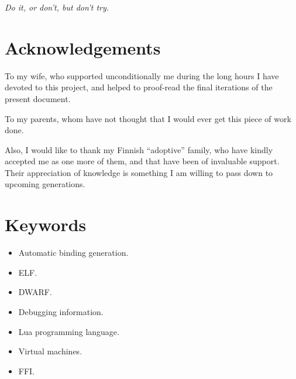 \documentclass[a4paper,
	fontsize=12pt,
	titlepage=firstiscover,
	chapterprefix=true,
	appendixprefix=true,
	headings=big,
	headsepline,
	toc=bibliographynumbered,
	twoside]{scrbook}
\begin{document}
\frontmatter

\clearpage
\listoftodos

\cleardoublepage
\begin{minipage}[t][6cm][l]{\textwidth}
	\vspace{10cm}
	\begin{flushright}
		\textit{Do it, or don't, but don't try.}
	\end{flushright}
\end{minipage}

\cleardoublepage
\chapter*{Acknowledgements}


\begin{minipage}{0.6\textwidth}
\begin{raggedleft} \itshape

To my wife, who supported unconditionally me during the long hours I have
devoted to this project, and helped to proof-read the final iterations of the
present document.

\vspace{2cm}

To my parents, whom have not thought that I would ever get this piece of work
done.

\vspace{2cm}

Also, I would like to thank my Finnish “adoptive” family, who have kindly
accepted me as one more of them, and that have been of invaluable support.
Their appreciation of knowledge is something I am willing to pass down to
upcoming generations.

\end{raggedleft}
\end{minipage}


\cleardoublepage


\cleardoublepage
\chapter*{Keywords}
\begin{itemize}
	\item Automatic binding generation.
	\item ELF.
	\item DWARF.
	\item Debugging information.
	\item Lua programming language.
	\item Virtual machines.
	\item FFI.
\end{itemize}
\end{document}
